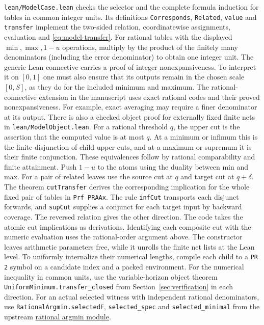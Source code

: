 \texttt{lean/ModelCase.lean} checks the selector and the complete formula
induction for tables in common integer units. Its definitions
\texttt{Corresponds}, \texttt{Related}, \texttt{value} and
\texttt{transfer} implement the two-sided relation, coordinatewise
assignments, evaluation and \eqref{eq:model-transfer}. For rational
tables with the displayed $\min,\max,1-u$ operations, multiply by
the product of the finitely many denominators (including the error
denominator) to obtain one integer unit. The generic Lean connective carries a proof of
integer nonexpansiveness. To interpret it on $[0,1]$ one must also ensure
that its outputs remain in the chosen scale $[0,S]$, as they do for the
included minimum and maximum. The rational-connective extension in the
manuscript uses exact rational codes and their proved nonexpansiveness.
For example, exact averaging may require a finer denominator at its
output. There is also a checked object proof for externally fixed finite nets in
\texttt{lean/ModelObject.lean}. For a rational threshold $q$, the upper
cut is the assertion that the computed value is at most $q$. At a
minimum or infimum this is the finite disjunction of child upper cuts,
and at a maximum or supremum it is their finite conjunction. These
equivalences follow by rational comparability and finite attainment.
Push $1-u$ to the atoms using the duality between min and max.
For a pair of related leaves use the source cut at $q$ and target
cut at $q+\delta$. The theorem \texttt{cutTransfer} derives the
corresponding implication for the whole fixed pair of tables in
\texttt{Prf PRAAx}. The rule \texttt{infCut} transports each disjunct forwards,
and \texttt{supCut} supplies a conjunct for each target input by
backward coverage. The reversed relation gives the other direction.
The code takes the atomic cut implications as derivations. Identifying
each composite cut with the numeric evaluation uses the rational-order
argument above. The constructor leaves
arithmetic parameters free, while it unrolls the finite net lists at the
Lean level. To uniformly internalize their numerical lengths, compile
each child to a \texttt{PR 2} symbol on a candidate index and a packed
environment. For the numerical inequality in common units, use the variable-horizon object theorem \texttt{UniformMinimum.transfer\_closed} from Section~\ref{sec:verification} in each direction. For an actual selected witness with independent rational denominators, use
\texttt{RationalArgmin.selectedF}, \texttt{selected\_spec} and
\texttt{selected\_minimal} from
the upstream \href{https://github.com/VladimirReshetnikov/ProveIt/blob/5f3be02388442f16487d2dc5c2529961dd783d2b/Logic/PrimitiveRecursiveArithmetic/Derivations/Lean/IPRADerivations/Analysis/RationalArgmin.lean}{rational argmin module}.
